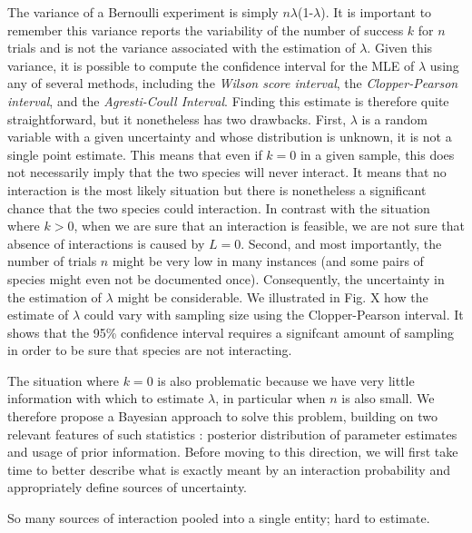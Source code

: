 \documentclass[12pt]{article}
\begin{document}
  The variance of a Bernoulli experiment is simply $n\lambda$(1-$\lambda$). It is important to remember this variance reports the variability of the number of success $k$ for $n$ trials and is not the variance associated with the estimation of $\lambda$.
  Given this variance, it is possible to compute the confidence interval for the MLE of $\lambda$ using any of several methods, including the \emph{Wilson score interval}, the \emph{Clopper-Pearson interval}, and the \emph{Agresti-Coull Interval}. Finding this estimate is therefore quite straightforward, but it nonetheless has two drawbacks. First, $\lambda$ is a random variable with a given uncertainty and whose distribution is unknown, it is not a single point estimate. This means that even if $k = 0$ in a given sample, this does not necessarily imply that the two species will never interact. It means that no interaction is the most likely situation but there is nonetheless a significant chance that the two species could interaction. In contrast with the situation where $k>0$, when we are sure that an interaction is feasible, 
  we are not sure that absence of interactions is caused by $L=0$. Second, and most importantly, the number of trials $n$ might be very low in many instances (and some pairs of species might even not be documented once). Consequently, the uncertainty in the estimation of $\lambda$ might be considerable. We illustrated in Fig. X how the estimate of $\lambda$ could vary with sampling size using the Clopper-Pearson interval. It shows that the 95\% confidence interval requires a signifcant amount of sampling in order to be sure that species are not interacting. 


  The situation where $k = 0$ is also problematic because we have very little information with which to estimate $\lambda$, in particular when $n$ is also small. We therefore propose a Bayesian approach to solve this problem, building on two relevant features of such statistics : posterior distribution of parameter estimates and usage of prior information. Before moving to this direction, we will first take time to better describe what is exactly meant by an interaction probability and appropriately define sources of uncertainty.


  So many sources of interaction pooled into a single entity; hard to estimate.
\end{document}
